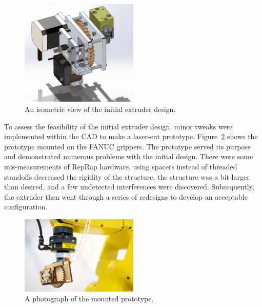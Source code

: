 \begin{figure}[h!]
\centering
\includegraphics[width=0.5\textwidth]{./figures/extruder-old-2}
\caption{An isometric view of the initial extruder design.}
\label{fig:old extruder}
\end{figure}

To assess the feasibility of the initial extruder design, minor tweaks were implemented within the CAD to make a laser-cut prototype.  Figure~\ref{fig:prototype extruder} shows the prototype mounted on the FANUC grippers. The prototype served its purpose and demonstrated numerous problems with the initial design. There were some mis-measurements of RepRap hardware, using spacers instead of threaded standoffs decreased the rigidity of the structure, the structure was a bit larger than desired, and a few undetected interferences were discovered. Subsequently, the extruder then went through a series of redesigns to develop an acceptable configuration.\\

\begin{figure}[h!]
\centering
\includegraphics[width=0.5\textwidth]{./figures/extruder-prototype-2}
\caption{A photograph of the mounted prototype.}
\label{fig:prototype extruder}
\end{figure}

